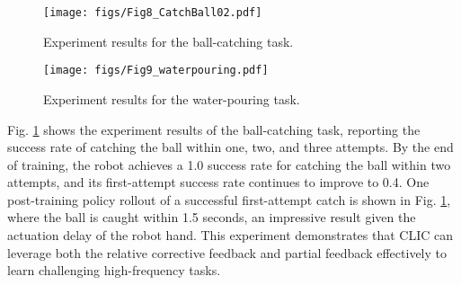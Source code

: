  \begin{figure}
    \centering
    \texttt{[image: figs/Fig8\_CatchBall02.pdf]}
	\caption{Experiment results for the ball-catching task.}
 \label{fig:Fig8_CatchBall}
\end{figure}

\begin{figure}
    \centering
    \texttt{[image: figs/Fig9\_waterpouring.pdf]}
	\caption{Experiment results for the water-pouring task.}
 \label{fig:Fig9_waterpouring}
\end{figure}

Fig. \ref{fig:Fig8_CatchBall} shows the experiment results of the ball-catching task, reporting the success rate of catching the ball within one, two, and three attempts. 
By the end of training, the robot achieves a 1.0 success rate for catching the ball within two attempts, and its first-attempt success rate continues to improve to 0.4.
One post-training policy rollout of a successful first-attempt catch is shown in Fig. \ref{fig:Fig8_CatchBall}, where the ball is caught within 1.5 seconds, an impressive result given the actuation delay of the robot hand.
This experiment demonstrates that CLIC can leverage both the relative corrective feedback and partial feedback effectively to learn challenging high-frequency tasks. 







